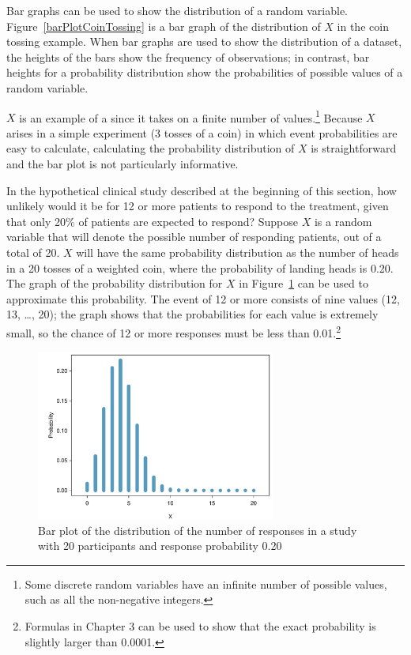 Bar graphs can be used to show the distribution of a random variable.  Figure~\ref{barPlotCoinTossing} is a bar graph of the distribution of $X$ in the coin tossing example. When bar graphs are used to show the distribution of a dataset, the heights of the bars show the frequency of observations; in contrast, bar heights for a probability distribution show the probabilities of possible values of a random variable.

$X$ is an example of a  since it takes on a finite number of values.\footnote{Some discrete random variables have an infinite number of possible values, such as all the non-negative integers.} Because $X$ arises in a simple experiment (3 tosses of a coin) in which event probabilities are easy to calculate, calculating the probability distribution of $X$ is straightforward and the bar plot is not particularly informative.  

In the hypothetical clinical study described at the beginning of this section, how unlikely would it be for 12 or more patients to respond to the treatment, given that only 20\% of patients are expected to respond? Suppose $X$ is a random variable that will denote the possible number of responding patients, out of a total of 20. $X$ will have the same probability distribution as the number of heads in a 20 tosses of a weighted coin, where the probability of landing heads is 0.20. The graph of the probability distribution for $X$ in Figure~\ref{distRespClinStudy} can be used to approximate this probability. The event of 12 or more consists of nine values (12, 13, \dots, 20); the graph shows that the probabilities for each value is extremely small, so the chance of 12 or more responses must be less than 0.01.\footnote{Formulas in Chapter 3 can be used to show that the exact probability is slightly larger than 0.0001.}

\begin{figure}[h]
\centering
\includegraphics[width=0.70\textwidth]
{ch_probability_oi_biostat/figures/distRespClinStudy/distRespClinStudy.pdf}
\caption{Bar plot of the distribution of the number of responses in a study with 20 participants and response probability 0.20}
\label{distRespClinStudy}
\end{figure}

